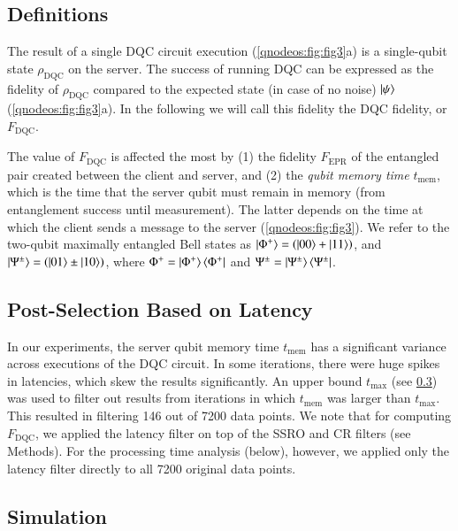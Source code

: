 \subsection{Definitions}

The result of a single \ac{DQC} circuit execution (\cref{qnodeos:fig:fig3}a) is a single-qubit state $\rho_{\text{DQC}}$ on the server. The success of running \ac{DQC} can be expressed as the fidelity of $\rho_{\text{DQC}}$ compared to the expected state (in case of no noise) $\ket{\psi}$ (\cref{qnodeos:fig:fig3}a). In the following we will call this fidelity the \ac{DQC} fidelity, or $F_{\text{DQC}}$.

The value of $F_{\text{DQC}}$ is affected the most by (1) the fidelity $F_{\text{EPR}}$ of the entangled pair created between the client and server, and (2) the \textit{qubit memory time} $t_{\text{mem}}$, which is the time that the server qubit must remain in memory (from entanglement success until measurement). The latter depends on the time at which the client sends a message to the server (\cref{qnodeos:fig:fig3}). We refer to the two-qubit maximally entangled Bell states as $\ket{\Phi^+} = \left(\ket{00} + \ket{11}\right)$, and $\ket{\Psi^{\pm}} = \left(\ket{01} \pm \ket{10}\right)$, where $\Phi^+ = \ket{\Phi^+}\bra{\Phi^+}$ and $\Psi^{\pm} = \ket{\Psi^{\pm}}\bra{\Psi^{\pm}}$.

\subsection{Post-Selection Based on Latency}
\label{qnodeos:sec:post-selection-latency}

In our experiments, the server qubit memory time $t_{\text{mem}}$ has a significant variance across executions of the \ac{DQC} circuit. In some iterations, there were huge spikes in latencies, which skew the results significantly. An upper bound $t_{\max}$ (see \cref{qnodeos:sec:dqc-simulation}) was used to filter out results from iterations in which $t_{\text{mem}}$ was larger than $t_{\max}$. This resulted in filtering 146 out of 7200 data points. We note that for computing $F_{\text{DQC}}$, we applied the latency filter on top of the \ac{SSRO} and \ac{CR} filters (see Methods). For the processing time analysis (below), however, we applied only the latency filter directly to all 7200 original data points.

\subsection{Simulation}
\label{qnodeos:sec:dqc-simulation}


